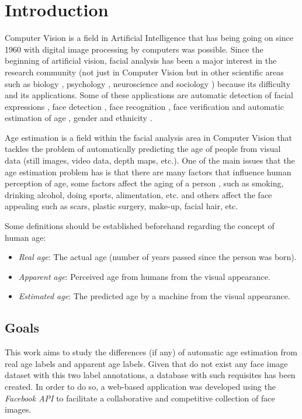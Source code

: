 \chapter{Introduction} \label{chap:introduction}

Computer Vision is a field in Artificial Intelligence that has being going on since 1960 with digital image processing by computers was possible. Since the beginning of artificial vision, facial analysis has been a major interest in the research community (not just in Computer Vision but in other scientific areas such as biology \cite{bhl24064}, psychology \cite{ekm02}, neuroscience \cite{freiwald2009face} and sociology \cite{kemper1978social}) because its difficulty and its applications. Some of these applications are automatic detection of facial expressions \cite{cohen2003facial}, face detection \cite{hsu2002face}, face recognition \cite{wright2009robust}, face verification \cite{taigman2014deepface} and automatic estimation of age \cite{4359348}, gender \cite{alexandre2010gender} and ethnicity \cite{hosoi2004ethnicity}.

Age estimation is a field within the facial analysis area in Computer Vision that tackles the problem of automatically predicting the age of people from visual data (still images, video data, depth maps, etc.). One of the main issues that the age estimation problem has is that there are many factors that influence human perception of age, some factors affect the aging of a person \cite{shephard1997aging}, such as smoking, drinking alcohol, doing sports, alimentation, etc. and others affect the face appealing such as scars, plastic surgery, make-up, facial hair, etc.

Some definitions should be established beforehand regarding the concept of human age:
\begin{itemize}
	\item \textit{Real age}: The actual age (number of years passed since the person was born).
	\item \textit{Apparent age}: Perceived age from humans from the visual appearance. 
	\item \textit{Estimated age}: The predicted age by a machine from the visual appearance.
\end{itemize}

\section{Goals}
This work aims to study the differences (if any) of automatic age estimation from real age labels and apparent age labels. Given that do not exist any face image dataset with this two label annotations, a database with such requisites has been created. In order to do so, a web-based application was developed using the \textit{Facebook API} to facilitate a collaborative and competitive collection of face images.

